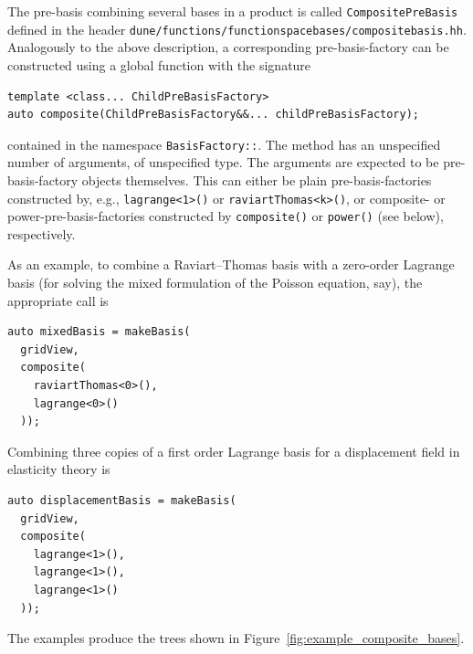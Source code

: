 \documentclass[a4paper,10pt,headings=normal,bibliography=totoc]{scrartcl}
\newcommand{\cpp}[1]{\lstinline[basicstyle=\ttfamily]!#1!}
\newcommand{\file}[1]{\texttt{#1}}
\begin{document}
The pre-basis combining several bases in a product is called \cpp{CompositePreBasis}
defined in the header \file{dune/functions/functionspacebases/compositebasis.hh}.
Analogously to the above description, a corresponding pre-basis-factory
can be constructed using a global function
with the signature
\begin{lstlisting}[style=Interface]
template <class... ChildPreBasisFactory>
auto composite(ChildPreBasisFactory&&... childPreBasisFactory);
\end{lstlisting}
contained in the namespace  \cpp{BasisFactory::}.
The method has an unspecified number of arguments, of unspecified type.
The arguments are expected to be pre-basis-factory objects themselves.
This can either be plain pre-basis-factories constructed by, e.g.,
\cpp{lagrange<1>()} or \cpp{raviartThomas<k>()},
or composite- or power-pre-basis-factories constructed by \cpp{composite()}
or \cpp{power()} (see below), respectively.

As an example, to combine a Raviart--Thomas basis with a zero-order Lagrange basis (for solving
the mixed formulation of the Poisson equation, say), the appropriate call is
\begin{lstlisting}[style=Example]
auto mixedBasis = makeBasis(
  gridView,
  composite(
    raviartThomas<0>(),
    lagrange<0>()
  ));
\end{lstlisting}
Combining three copies of a first order Lagrange basis for a displacement field in elasticity theory is
\begin{lstlisting}[style=Example]
auto displacementBasis = makeBasis(
  gridView,
  composite(
    lagrange<1>(),
    lagrange<1>(),
    lagrange<1>()
  ));
\end{lstlisting}
The examples produce the trees shown in Figure~\ref{fig:example_composite_bases}.
\end{document}
